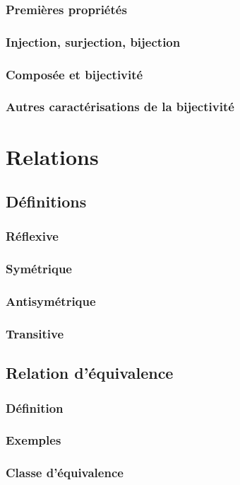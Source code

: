 \documentclass[12pt,a4paper,french]{book}
\begin{document}
			\subsubsection{Premières propriétés}
			\subsubsection{Injection, surjection, bijection}
			\subsubsection{Composée et bijectivité}
			\subsubsection{Autres caractérisations de la bijectivité}
	\section{Relations}
		\subsection{Définitions}
			\subsubsection{Réflexive}
			\subsubsection{Symétrique}
			\subsubsection{Antisymétrique}
			\subsubsection{Transitive}
		\subsection{Relation d'équivalence}
			\subsubsection{Définition}
			\subsubsection{Exemples}
			\subsubsection{Classe d'équivalence}
\end{document}
